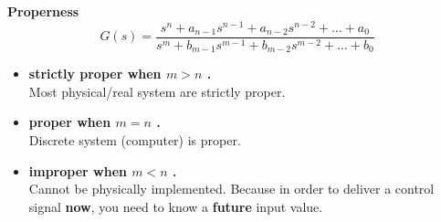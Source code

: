 \textbf{Properness}
\begin{equation*}
    G(s) = \frac{s^n + a_{n-1}s^{n-1}+a_{n-2}s^{n-2}+\ldots + a_0}{s^m + b_{m-1}s^{m-1}+b_{m-2}s^{m-2}+\ldots + b_0}
\end{equation*}
\begin{itemize}
    \item \textbf{strictly proper when $m > n$ .} \\ Most physical/real system are strictly proper.
    \item \textbf{proper when $m = n$ .} \\ Discrete system (computer) is proper.
    \item \textbf{improper when $m < n$ .} \\ Cannot be physically implemented. Because in order to deliver a control signal \textbf{now}, you need to know a \textbf{future} input value.
\end{itemize}

